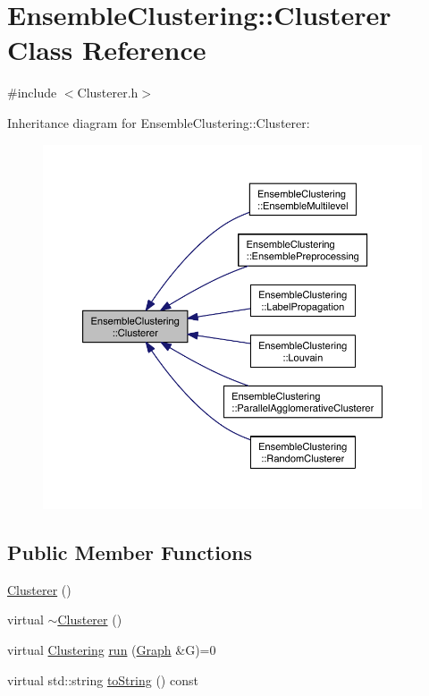 \hypertarget{class_ensemble_clustering_1_1_clusterer}{\section{Ensemble\-Clustering\-:\-:Clusterer Class Reference}
\label{class_ensemble_clustering_1_1_clusterer}
}


{\ttfamily \#include $<$Clusterer.\-h$>$}



Inheritance diagram for Ensemble\-Clustering\-:\-:Clusterer\-:
\nopagebreak
\begin{figure}[H]
\begin{center}
\leavevmode
\includegraphics[width=350pt]{class_ensemble_clustering_1_1_clusterer__inherit__graph}
\end{center}
\end{figure}
\subsection*{Public Member Functions}
\begin{DoxyCompactItemize}
\item 
\hyperlink{class_ensemble_clustering_1_1_clusterer_acbd9729676a2793bccffbacec6bd13f9}{Clusterer} ()
\item 
virtual \hyperlink{class_ensemble_clustering_1_1_clusterer_a93a0ef31adf30861adc1db201174953f}{$\sim$\-Clusterer} ()
\item 
virtual \hyperlink{class_ensemble_clustering_1_1_clustering}{Clustering} \hyperlink{class_ensemble_clustering_1_1_clusterer_a9fab8db7082b6399e1d29509512cad91}{run} (\hyperlink{class_ensemble_clustering_1_1_graph}{Graph} \&G)=0
\item 
virtual std\-::string \hyperlink{class_ensemble_clustering_1_1_clusterer_aba1a37081af12061ef675139668c5ee6}{to\-String} () const 
\end{DoxyCompactItemize}


